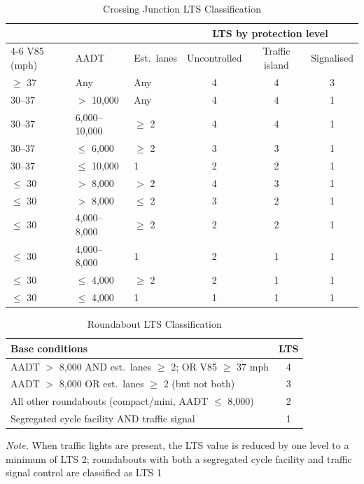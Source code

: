 \begin{table}[htbp]
  \centering
  \caption{Crossing Junction LTS Classification}
  \label{tab:crossing-lts}
  \begin{tabularx}{\textwidth}{X X X c c c}
    \toprule
    & & & \multicolumn{3}{c}{LTS by protection level} \\
    \cmidrule(lr){4-6}
    V85 (mph) & AADT & Est.\ lanes & Uncontrolled & Traffic island & Signalised \\
    \midrule
    $\geq$ 37   & Any            & Any      & 4 & 4 & 3 \\
    30--37      & $>$ 10,000     & Any      & 4 & 4 & 1 \\
    30--37      & 6,000--10,000  & $\geq$ 2 & 4 & 4 & 1 \\
    30--37      & $\leq$ 6,000   & $\geq$ 2 & 3 & 3 & 1 \\
    30--37      & $\leq$ 10,000  & 1        & 2 & 2 & 1 \\
    $\leq$ 30   & $>$ 8,000      & $>$ 2    & 4 & 3 & 1 \\
    $\leq$ 30   & $>$ 8,000      & $\leq$ 2 & 3 & 2 & 1 \\
    $\leq$ 30   & 4,000--8,000   & $\geq$ 2 & 2 & 2 & 1 \\
    $\leq$ 30   & 4,000--8,000   & 1        & 2 & 1 & 1 \\
    $\leq$ 30   & $\leq$ 4,000   & $\geq$ 2 & 2 & 1 & 1 \\
    $\leq$ 30   & $\leq$ 4,000   & 1        & 1 & 1 & 1 \\
    \bottomrule
  \end{tabularx}
\end{table}

\begin{table}[htbp]
  \centering
  \caption{Roundabout LTS Classification}
  \label{tab:roundabout-lts}
  \begin{tabularx}{\textwidth}{X c}
    \toprule
    Base conditions & LTS \\
    \midrule
    AADT $>$ 8,000 AND est.\ lanes $\geq$ 2; OR V85 $\geq$ 37 mph & 4 \\
    AADT $>$ 8,000 OR est.\ lanes $\geq$ 2 (but not both)         & 3 \\
    All other roundabouts (compact/mini, AADT $\leq$ 8,000)       & 2 \\
    Segregated cycle facility AND traffic signal                  & 1 \\
    \bottomrule
  \end{tabularx}

  \smallskip
  {\footnotesize \textit{Note.} When traffic lights are present, the LTS value is
  reduced by one level to a minimum of LTS 2; roundabouts with both a segregated cycle facility and traffic signal control are classified as LTS 1}
\end{table}

